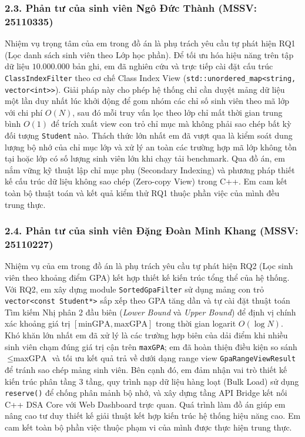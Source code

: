\documentclass[14pt,a4paper]{extarticle}
\begin{document}
\subsubsection*{2.3. Phản tư của sinh viên Ngô Đức Thành (MSSV: 25110335)}
{}
Nhiệm vụ trọng tâm của em trong đồ án là phụ trách yêu cầu tự phát hiện RQ1 (Lọc danh sách sinh viên theo Lớp học phần). Để tối ưu hóa hiệu năng trên tập dữ liệu $10.000.000$ bản ghi, em đã nghiên cứu và trực tiếp cài đặt cấu trúc \texttt{ClassIndexFilter} theo cơ chế Class Index View (\texttt{std::unordered\_map<string, vector<int>>}). Giải pháp này cho phép hệ thống chỉ cần duyệt mảng dữ liệu một lần duy nhất lúc khởi động để gom nhóm các chỉ số sinh viên theo mã lớp với chi phí $O(N)$, sau đó mỗi truy vấn lọc theo lớp chỉ mất thời gian trung bình $O(1)$ để trích xuất view con trỏ chỉ mục mà không phải sao chép bất kỳ đối tượng \texttt{Student} nào. Thách thức lớn nhất em đã vượt qua là kiểm soát dung lượng bộ nhớ của chỉ mục lớp và xử lý an toàn các trường hợp mã lớp không tồn tại hoặc lớp có số lượng sinh viên lớn khi chạy tải benchmark. Qua đồ án, em nắm vững kỹ thuật lập chỉ mục phụ (Secondary Indexing) và phương pháp thiết kế cấu trúc dữ liệu không sao chép (Zero-copy View) trong C++. Em cam kết toàn bộ thuật toán và kết quả kiểm thử RQ1 thuộc phần việc của mình đều trung thực.

\subsubsection*{2.4. Phản tư của sinh viên Đặng Đoàn Minh Khang (MSSV: 25110227)}
{}
Nhiệm vụ của em trong đồ án là phụ trách yêu cầu tự phát hiện RQ2 (Lọc sinh viên theo khoảng điểm GPA) kết hợp thiết kế kiến trúc tổng thể của hệ thống. Với RQ2, em xây dựng module \texttt{SortedGpaFilter} sử dụng mảng con trỏ \texttt{vector<const Student*>} sắp xếp theo GPA tăng dần và tự cài đặt thuật toán Tìm kiếm Nhị phân 2 đầu biên (\textit{Lower Bound} và \textit{Upper Bound}) để định vị chính xác khoảng giá trị $[\text{minGPA}, \text{maxGPA}]$ trong thời gian logarit $O(\log N)$. Khó khăn lớn nhất em đã xử lý là các trường hợp biên của dải điểm khi nhiều sinh viên chạm đúng giá trị cận trên \texttt{maxGPA}; em đã hoàn thiện điều kiện so sánh $\le \text{maxGPA}$ và tối ưu kết quả trả về dưới dạng range view \texttt{GpaRangeViewResult} để tránh sao chép mảng sinh viên. Bên cạnh đó, em đảm nhận vai trò thiết kế kiến trúc phân tầng 3 tầng, quy trình nạp dữ liệu hàng loạt (Bulk Load) sử dụng \texttt{reserve()} để chống phân mảnh bộ nhớ, và xây dựng tầng API Bridge kết nối C++ DSA Core với Web Dashboard trực quan. Quá trình làm đồ án giúp em nâng cao tư duy thiết kế giải thuật kết hợp kiến trúc hệ thống hiệu năng cao. Em cam kết toàn bộ phần việc thuộc phạm vi của mình được thực hiện trung thực.
\end{document}
